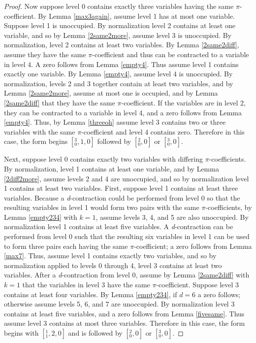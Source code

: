\documentclass[12pt]{amsart}
\begin{document}
\begin{proof}
Now suppose level 0 contains exactly three variables having the same $\pi$-coefficient.  By Lemma \ref{max3again}, assume level 1 has at most one variable.  Suppose level 1 is unoccupied.  By normalization level 2 contains at least one variable, and so by Lemma \ref{2same2more}, assume level 3 is unoccupied.  By normalization, level 2 contains at least two variables.  By Lemma \ref{2same2diff}, assume they have the same $\pi$-coefficient and thus can be contracted to a variable in level 4.  A zero follows from Lemma \ref{empty4}.  Thus assume level 1 contains exactly one variable.  By Lemma \ref{empty4}, assume level 4 is unoccupied.  By normalization, levels 2 and 3 together contain at least two variables, and by Lemma \ref{2same2more}, assume at most one is occupied, and by Lemma \ref{2same2diff} that they have the same $\pi$-coefficient.  If the variables are in level 2, they can be contracted to a variable in level 4, and a zero follows from Lemma \ref{empty4}.  Thus, by Lemma \ref{threeoh} assume level 3 contains two or three variables with the same $\pi$-coefficient and level 4 contains zero.  Therefore in this case, the form begins $[{}^3_0, 1, 0]$ followed by $[{}^2_0,0]$ or $[{}^3_0,0]$.

Next, suppose level 0 contains exactly two variables with differing $\pi$-coefficients.  By normalization, level 1 contains at least one variable, and by Lemma \ref{2diff2more}, assume levels 2 and 4 are unoccupied, and so by normalization level 1 contains at least two variables.  First, suppose level 1 contains at least three variables.  Because a \textit{d}-contraction could be performed from level 0 so that the resulting variables in level 1 would form two pairs with the same $\pi$-coefficients, by Lemma \ref{empty234} with $k=1$, assume levels 3, 4, and 5 are also unoccupied.  By normalization level 1 contains at least five variables.  A \textit{d}-contraction can be performed from level 0 such that the resulting six variables in level 1 can be used to form three pairs each having the same $\pi$-coefficient; a zero follows from Lemma \ref{max7}.  Thus, assume level 1 contains exactly two variables, and so by normalization applied to levels 0 through 4, level 3 contains at least two variables.  After a \textit{d}-contraction from level 0, assume by Lemma \ref{2same2diff} with $k=1$ that the variables in level 3 have the same $\pi$-coefficient.  Suppose level 3 contains at least four variables.  By Lemma \ref{empty234}, if $d=6$ a zero follows; otherwise assume levels 5, 6, and 7 are unoccupied.  By normalization level 3 contains at least five variables, and a zero follows from Lemma \ref{fivesame}.  Thus assume level 3 contains at most three variables.  Therefore in this case, the form begins with $[{}^1_1, 2, 0]$ and is followed by $[{}^2_0, 0]$ or $[{}^3_0, 0]$.


\end{proof}
\end{document}
